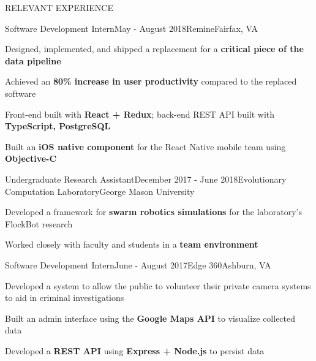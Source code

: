 \documentclass{resume} %
\begin{document}
\begin{rSection}{RELEVANT EXPERIENCE}

\begin{rSubsection}{Software Development Intern}{May - August 2018}{Remine}{Fairfax, VA} 

  \item Designed, implemented, and shipped a replacement for a \textbf{critical piece of the data pipeline}
  \item Achieved an \textbf{80\% increase in user productivity} compared to the replaced software
  \item Front-end built with \textbf{React + Redux}; back-end REST API built with \textbf{TypeScript, PostgreSQL}
  \item Built an \textbf{iOS native component} for the React Native mobile team using \textbf{Objective-C}
  
\end{rSubsection}

\begin{rSubsection}{Undergraduate Research Assistant}{December 2017 - June 2018}{Evolutionary Computation Laboratory}{George Mason University} 

  \item Developed a framework for \textbf{swarm robotics simulations} for the laboratory’s FlockBot research
  \item Worked closely with faculty and students in a \textbf{team environment}
  
\end{rSubsection} 

\begin{rSubsection}{Software Development Intern}{June - August 2017}{Edge 360}{Ashburn, VA} 

  \item Developed a system to allow the public to volunteer their private camera systems to aid in criminal investigations
  \item Built an admin interface using the \textbf{Google Maps API} to visualize collected data
  \item Developed a \textbf{REST API} using \textbf{Express + Node.js} to persist data
  
\end{rSubsection} 

\end{rSection}

\end{document}

